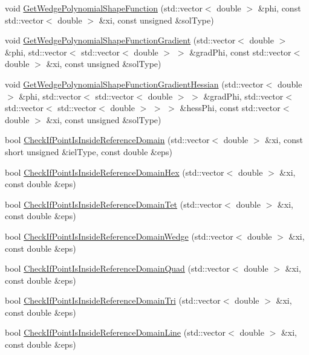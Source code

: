\begin{DoxyCompactItemize}
\item 
void \mbox{\hyperlink{namespacefemus_a524cf02fcd06e7ce0eedece31381e256}{Get\+Wedge\+Polynomial\+Shape\+Function}} (std\+::vector$<$ double $>$ \&phi, const std\+::vector$<$ double $>$ \&xi, const unsigned \&sol\+Type)
\item 
void \mbox{\hyperlink{namespacefemus_a9353c0e0a9cf18b653c60a3dd9b5c08a}{Get\+Wedge\+Polynomial\+Shape\+Function\+Gradient}} (std\+::vector$<$ double $>$ \&phi, std\+::vector$<$ std\+::vector$<$ double $>$ $>$ \&grad\+Phi, const std\+::vector$<$ double $>$ \&xi, const unsigned \&sol\+Type)
\item 
void \mbox{\hyperlink{namespacefemus_ad4742e8fddfada4e3dbfe5aae4683694}{Get\+Wedge\+Polynomial\+Shape\+Function\+Gradient\+Hessian}} (std\+::vector$<$ double $>$ \&phi, std\+::vector$<$ std\+::vector$<$ double $>$ $>$ \&grad\+Phi, std\+::vector$<$ std\+::vector$<$ std\+::vector$<$ double $>$ $>$ $>$ \&hess\+Phi, const std\+::vector$<$ double $>$ \&xi, const unsigned \&sol\+Type)
\item 
bool \mbox{\hyperlink{namespacefemus_a7da70cafeeeae70a143195ebc5f991de}{Check\+If\+Point\+Is\+Inside\+Reference\+Domain}} (std\+::vector$<$ double $>$ \&xi, const short unsigned \&iel\+Type, const double \&eps)
\item 
bool \mbox{\hyperlink{namespacefemus_afbdc1796e04b92a1b1242ec4da84a246}{Check\+If\+Point\+Is\+Inside\+Reference\+Domain\+Hex}} (std\+::vector$<$ double $>$ \&xi, const double \&eps)
\item 
bool \mbox{\hyperlink{namespacefemus_a10204bb57de5df399a274f99b1b3ac2f}{Check\+If\+Point\+Is\+Inside\+Reference\+Domain\+Tet}} (std\+::vector$<$ double $>$ \&xi, const double \&eps)
\item 
bool \mbox{\hyperlink{namespacefemus_a3b749091251a9d0500a95f9c7294e427}{Check\+If\+Point\+Is\+Inside\+Reference\+Domain\+Wedge}} (std\+::vector$<$ double $>$ \&xi, const double \&eps)
\item 
bool \mbox{\hyperlink{namespacefemus_ab66c0e0cf313a357f54330e3674ffa64}{Check\+If\+Point\+Is\+Inside\+Reference\+Domain\+Quad}} (std\+::vector$<$ double $>$ \&xi, const double \&eps)
\item 
bool \mbox{\hyperlink{namespacefemus_ad8bb075186aea0a066daae8531cadb9e}{Check\+If\+Point\+Is\+Inside\+Reference\+Domain\+Tri}} (std\+::vector$<$ double $>$ \&xi, const double \&eps)
\item 
bool \mbox{\hyperlink{namespacefemus_ad7a83e8b49ce11bd61a9a08ec95e8946}{Check\+If\+Point\+Is\+Inside\+Reference\+Domain\+Line}} (std\+::vector$<$ double $>$ \&xi, const double \&eps)

\end{DoxyCompactItemize}
